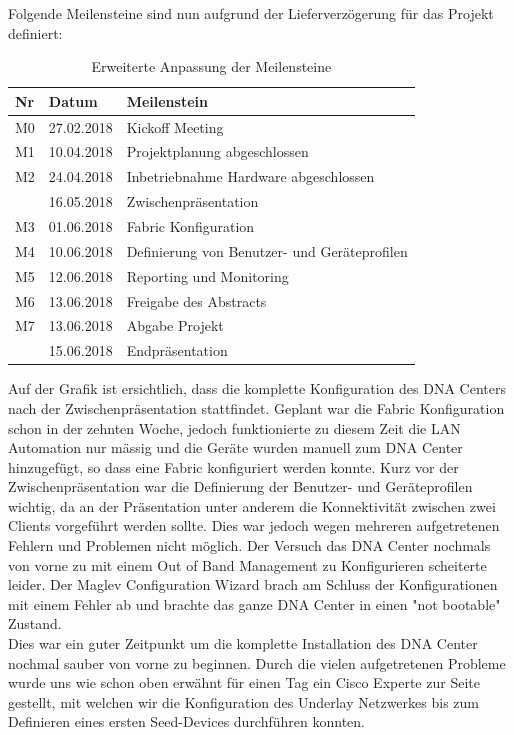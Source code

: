 Folgende Meilensteine sind nun aufgrund der Lieferverzögerung für das Projekt definiert:
\begin{table}[H]
	\centering
	\begin{tabularx}{\textwidth}{p{1cm}| p{2.5cm}| X}
		\rowcolor{gray!50}
		\textbf{Nr} & \textbf{Datum} & \textbf{Meilenstein} \\
		\hline	
		M0 & 27.02.2018 & Kickoff Meeting \\
		M1 & 10.04.2018 & Projektplanung abgeschlossen \\
		M2 & 24.04.2018 & Inbetriebnahme Hardware abgeschlossen \\
		   & 16.05.2018 & Zwischenpräsentation \\
		M3 & 01.06.2018 & Fabric Konfiguration \\
		M4 & 10.06.2018 & Definierung von Benutzer- und Geräteprofilen \\
		M5 & 12.06.2018 & Reporting und Monitoring \\
		M6 & 13.06.2018 & Freigabe des Abstracts \\
		M7 & 13.06.2018 & Abgabe Projekt \\
		   & 15.06.2018 & Endpräsentation \\
	\end{tabularx}
	\caption{Erweiterte Anpassung der Meilensteine}
	\label{tab:Erweiterte Anpassung der Meilensteine}
\end{table}

Auf der Grafik ist ersichtlich, dass die komplette Konfiguration des DNA Centers nach der Zwischenpräsentation stattfindet. Geplant war die Fabric Konfiguration schon in der zehnten Woche, jedoch funktionierte zu diesem Zeit die LAN Automation nur mässig und die Geräte wurden manuell zum DNA Center hinzugefügt, so dass eine Fabric konfiguriert werden konnte. Kurz vor der Zwischenpräsentation war die Definierung der Benutzer- und Geräteprofilen wichtig, da an der Präsentation unter anderem die Konnektivität zwischen zwei Clients vorgeführt werden sollte. Dies war jedoch wegen mehreren aufgetretenen Fehlern und Problemen nicht möglich. Der Versuch das DNA Center nochmals von vorne zu mit einem Out of Band Management zu Konfigurieren scheiterte leider. Der Maglev Configuration Wizard brach am Schluss der Konfigurationen mit einem Fehler ab und brachte das ganze DNA Center in einen "not bootable" Zustand. \\
Dies war ein guter Zeitpunkt um die komplette Installation des DNA Center nochmal sauber von vorne zu beginnen. Durch die vielen aufgetretenen Probleme wurde uns wie schon oben erwähnt für einen Tag ein Cisco Experte zur Seite gestellt, mit welchen wir die Konfiguration des Underlay Netzwerkes bis zum Definieren eines ersten Seed-Devices durchführen konnten.




